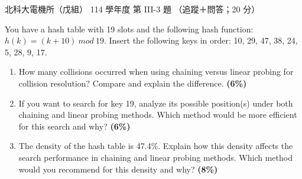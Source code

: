 \begin{pastexam}[label={px:ntut-114-ee-ds-11}]{北科大電機所（戊組） 114 學年度 第 III-3 題}
（追蹤＋問答；20 分）

You have a hash table with 19 slots and the following hash function: $h(k)=(k+10)\ mod\ 19$. Insert
the following keys in order: 10, 29, 47, 38, 24, 5, 28, 9, 17.
\begin{enumerate}[label=(\alph*)]
\item How many collisions occurred when using chaining versus linear probing for collision resolution?
Compare and explain the difference. \textbf{(6\%)}
\item If you want to search for key 19, analyze its possible position(s) under both chaining and linear
probing methods. Which method would be more efficient for this search and why? \textbf{(6\%)}
\item The density of the hash table is 47.4\%. Explain how this density affects the search performance
in chaining and linear probing methods. Which method would you recommend for this density and why?
\textbf{(8\%)}
\end{enumerate}
\end{pastexam}

